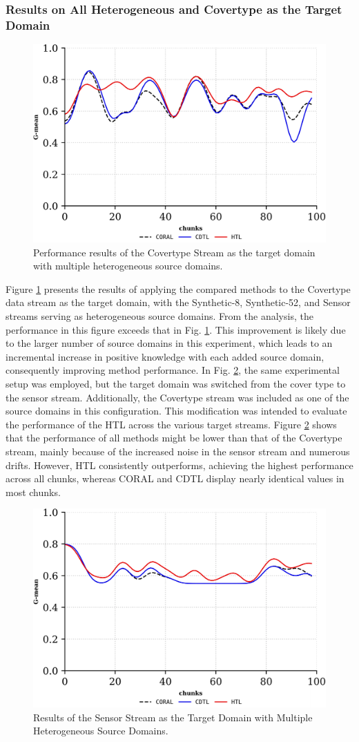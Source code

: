 \subsubsection{Results on All Heterogeneous and Covertype as the Target Domain}
\begin{figure}[H]
	\centering
	\includegraphics[width=0.6\linewidth]{6_transfer_learning/figures/exp2_1.png}
  \caption{Performance results of the Covertype Stream as the target domain with multiple heterogeneous source domains.}
	\label{fig:6_exp4}
\end{figure}
Figure \ref{fig:6_exp4} presents the results of applying the compared methods to the Covertype data stream as the target domain, with the Synthetic-8, Synthetic-52, and Sensor streams serving as heterogeneous source domains. From the analysis, the performance in this figure exceeds that in Fig. \ref{fig:6_exp4}. This improvement is likely due to the larger number of source domains in this experiment, which leads to an incremental increase in positive knowledge with each added source domain, consequently improving method performance. In Fig. \ref{fig:6_exp5}, the same experimental setup was employed, but the target domain was switched from the cover type to the sensor stream. Additionally, the Covertype stream was included as one of the source domains in this configuration. This modification was intended to evaluate the performance of the HTL across the various target streams. Figure \ref{fig:6_exp5} shows that the performance of all methods might be lower than that of the Covertype stream, mainly because of the increased noise in the sensor stream and numerous drifts. However, HTL consistently outperforms, achieving the highest performance across all chunks, whereas CORAL and CDTL display nearly identical values in most chunks.

\begin{figure}[H]
	\centering
	\includegraphics[width=0.6\linewidth]{6_transfer_learning/figures/exp3.png}
  \caption{Results of the Sensor Stream as the Target Domain with Multiple Heterogeneous Source Domains.}

	\label{fig:6_exp5}
\end{figure}

